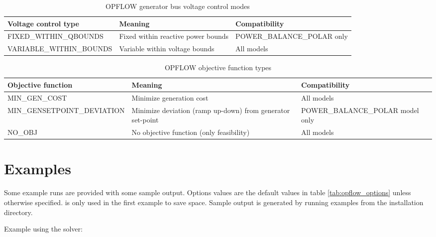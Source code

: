 \begin{table}[H]
  \centering
  \caption{OPFLOW generator bus voltage control modes}
  \begin{tabular}{|p{}|p{}|p{}|}
    \hline
    \textbf{Voltage control type} & \textbf{Meaning} & \textbf{Compatibility}\\ \hline
    FIXED\_WITHIN\_QBOUNDS & Fixed within reactive power bounds & POWER\_BALANCE\_POLAR only \\ \hline
    VARIABLE\_WITHIN\_BOUNDS & Variable within voltage bounds & All models \\ \hline
  \end{tabular}
\label{tab:opflow_genbusvoltage}
\end{table}

\begin{table}[H]
  \centering
  \caption{OPFLOW objective function types}
  \begin{tabular}{|p{}|p{}|p{}|}
    \hline
    \textbf{Objective function} & \textbf{Meaning} & \textbf{Compatibility}\\ \hline
    MIN\_GEN\_COST & Minimize generation cost & All models \\ \hline
    MIN\_GENSETPOINT\_DEVIATION & Minimize deviation (ramp up-down) from generator set-point & POWER\_BALANCE\_POLAR model only\\ \hline
    NO\_OBJ & No objective function (only feasibility) & All models \\ \hline
  \end{tabular}
\label{tab:opflow_objtypes}
\end{table}


\section{Examples}

Some \opflow example runs are provided with some sample output. Options values are the default values in table \ref{tab:opflow_options} unless otherwise specified.  is only used in the first example to save space. Sample output is generated by running examples from the installation directory.

Example using the \ipopt solver:

